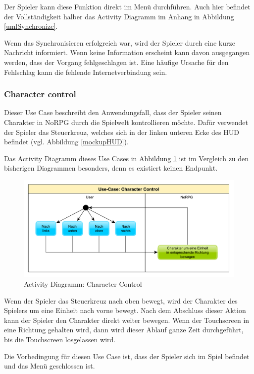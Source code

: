 			Der Spieler kann diese Funktion direkt im Menü durchführen. Auch hier befindet der Vollständigkeit halber das Activity Diagramm im Anhang in Abbildung \ref{umlSynchronize}.
	
			Wenn das Synchronisieren erfolgreich war, wird der Spieler durch eine kurze Nachricht informiert. Wenn keine Information erscheint kann davon ausgegangen werden, dass der Vorgang fehlgeschlagen ist. Eine häufige Ursache für den Fehlschlag kann die fehlende Internetverbindung sein.
		
		\subsubsection{Character control}
			Dieser Use Case beschreibt den Anwendungsfall, dass der Spieler seinen Charakter in NoRPG durch die Spielwelt kontrollieren möchte. Dafür verwendet der Spieler das Steuerkreuz, welches sich in der linken unteren Ecke des HUD befindet (vgl. Abbildung \ref{mockupHUD}).
			
			Das Activity Diagramm dieses Use Cases in Abbildung \ref{umlControl} ist im Vergleich zu den bisherigen Diagrammen besonders, denn es existiert keinen Endpunkt. 
			
			\begin{figure}[htbp]
				\centering 
				\label{umlControl}
				\includegraphics[width=13cm]{pics/CharacterControl.pdf}
				\caption{Activity Diagramm: Character Control}
			\end{figure}
		
			Wenn der Spieler das Steuerkreuz nach oben bewegt, wird der Charakter des Spielers um eine Einheit nach vorne bewegt. Nach dem Abschluss dieser Aktion kann der Spieler den Charakter direkt weiter bewegen. Wenn der Touchscreen in eine Richtung gehalten wird, dann wird dieser Ablauf ganze Zeit durchgeführt, bis die Touchscreen losgelassen wird.
			
			Die Vorbedingung für diesen Use Case ist, dass der Spieler sich im Spiel befindet und das Menü geschlossen ist.
	

